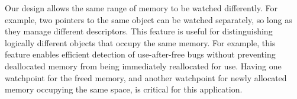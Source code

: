 \documentclass[letterpaper,twocolumn,10pt]{article}
\begin{document}


Our design allows the same range of memory to be watched differently. For example, two pointers to the same object can be watched separately, so long as they manage different descriptors. This feature is useful for distinguishing logically different objects that occupy the same memory. For example, this feature enables efficient detection of use-after-free bugs without preventing deallocated memory from being immediately reallocated for use. Having one watchpoint for the freed memory, and another watchpoint for newly allocated memory occupying the same space, is critical for this application. %
\end{document}
